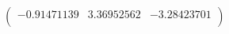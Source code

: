 \documentclass[12pt]{article}
\begin{document}







$
\begin{pmatrix}
-0.91471139  & 3.36952562 & -3.28423701\\
 \end{pmatrix}
$
\end{document}

